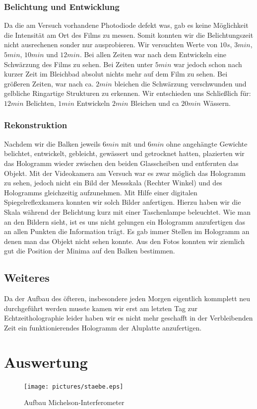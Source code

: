\documentclass[12pt]{article}
\begin{document}
\subsubsection{Belichtung und Entwicklung}
Da die am Versuch vorhandene Photodiode defekt was, gab es keine Möglichkeit die Intensität am Ort des Films zu messen. Somit konnten wir die Belichtungszeit
nicht ausrechenen sonder nur ausprobieren. Wir versuchten Werte von $10s$, $3min$, $5min$, $10min$ und $12min$. Bei allen Zeiten war nach dem Entwickeln eine
Schwärzung des Films zu sehen. Bei Zeiten unter $5min$ war jedoch schon nach kurzer Zeit im Bleichbad absolut nichts mehr auf dem Film zu sehen. Bei größeren
Zeiten, war nach ca. $2min$ bleichen die Schwärzung verschwunden und gelbliche Ringartige Strukturen zu erkennen. Wir entschieden uns Schließlich für:
$12min$ Belichten, $1min$ Entwickeln $2min$ Bleichen und ca $20min$ Wässern.

\subsubsection{Rekonstruktion}
Nachdem wir die Balken jeweils $6min$ mit und $6min$ ohne angehängte Gewichte belichtet, entwickelt, gebleicht, gewässert und getrocknet hatten, plazierten
wir das Hologramm wieder zwischen den beiden Glasscheiben und entfernten das Objekt. Mit der Videokamera am Versuch war es zwar möglich das Hologramm zu sehen,
jedoch nicht ein Bild der Messskala (Rechter Winkel) und des Hologramms gleichzeitig aufzunehmen. Mit Hilfe einer digitalen Spiegelreflexkamera konnten wir
solch Bilder anfertigen. Hierzu haben wir die Skala während der Belichtung kurz mit einer Taschenlampe beleuchtet. Wie man an den Bildern sieht, ist es uns
nicht gelungen ein Hologramm anzufertigen das an allen Punkten die Information trägt. Es gab immer Stellen im Hologramm an denen man das Objekt nicht sehen 
konnte. Aus den Fotos konnten wir ziemlich gut die Position der Minima auf den Balken bestimmen.

\subsection{Weiteres}
Da der Aufbau des öfteren, insbesondere jeden Morgen eigentlich kommplett neu durchgeführt werden musste kamen wir erst am letzten Tag zur Echtzeitholographie
leider haben wir es nicht mehr geschafft in der Verbleibenden Zeit ein funktionierendes Hologramm der Aluplatte anzufertigen.

\section{Auswertung}
\begin{figure}[h]
\centering
 \texttt{[image: pictures/staebe.eps]}
 \caption{Aufbau Michelson-Interferometer}
\end{figure}
\end{document}
